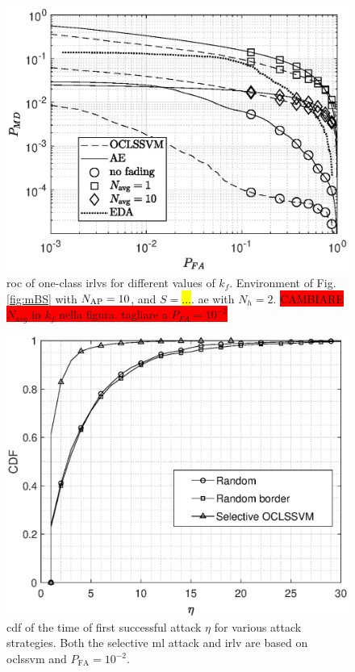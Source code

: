 \documentclass[draftcls,onecolumn,12pt]{IEEEtran}
\begin{document}
\begin{figure}[t]
    \centering
    \includegraphics[width=0.6\columnwidth]{res_Fading_10BS_oneClass.eps}
    \caption{\ac{roc} of one-class \acp{irlv} for different values of $k_f$. Environment of Fig. \ref{fig:mBS} with $N_{\rm AP}=10$, and $S=$\hl{...}.  \ac{ae} with $N_h = 2$. \colorbox{red}{CAMBIARE $N_{avg}$ in $k_f$ nella figura. tagliare a $P_{FA} = 10^{-2}$} }
    \label{fig:kf10Oc}
\end{figure}




\begin{figure}[t]
    \centering
    \includegraphics[width=0.6\columnwidth]{res_selective_SVM.eps}
    \caption{\ac{cdf} of the time of first successful attack $\eta$ for various attack strategies. Both the selective \ac{ml} attack  and \ac{irlv} are based on \ac{oclssvm} and $P_{\text{FA}}= 10^{-2}$.}
    \label{fig:selectiveSVM}
\end{figure}
\end{document}

